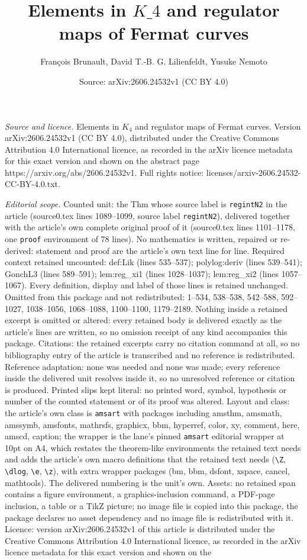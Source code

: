 \documentclass[10pt,a4paper]{amsart}
\title[Elements in $K\_4$ and regulator maps of Fermat curves]{Elements in $K\_4$ and regulator maps of Fermat curves}
\author{Fran\c{c}ois Brunault, David T.-B. G. Lilienfeldt, Yusuke Nemoto}
\date{Source: arXiv:2606.24532v1 (CC BY 4.0)}
\begin{document}
\maketitle

\noindent\emph{Source and licence.} Elements in $K_4$ and regulator maps of Fermat curves. Version arXiv:2606.24532v1 (CC BY 4.0), distributed under the Creative Commons Attribution 4.0 International licence, as recorded in the arXiv licence metadata for this exact version and shown on the abstract page https://arxiv.org/abs/2606.24532v1. Full rights notice: licenses/arxiv-2606.24532-CC-BY-4.0.txt.\par\smallskip

\noindent\textit{Editorial scope.} Counted unit: the Thm whose source label is \texttt{regintN2} in the article (source0.tex lines 1089--1099, source label \texttt{regintN2}), delivered together with the article's own complete original proof of it (source0.tex lines 1101--1178, one \texttt{proof} environment of 78 lines). No mathematics is written, repaired or re-derived: statement and proof are the article's own text line for line. Required context retained uncounted: def:Lik (lines 535--537); polylog:deriv (lines 539--541); GonchL3 (lines 589--591); lem:reg\_xi1 (lines 1028--1037); lem:reg\_xi2 (lines 1057--1067). Every definition, display and label of those lines is retained unchanged. Omitted from this package and not redistributed: 1--534, 538--538, 542--588, 592--1027, 1038--1056, 1068--1088, 1100--1100, 1179--2189. Nothing inside a retained excerpt is omitted or altered: every retained body is delivered exactly as the article's lines are written, so no omission receipt of any kind accompanies this package. Citations: the retained excerpts carry no citation command at all, so no bibliography entry of the article is transcribed and no reference is redistributed. Reference adaptation: none was needed and none was made; every reference inside the delivered unit resolves inside it, so no unresolved reference or citation is produced. Printed slips kept literal: no printed word, symbol, hypothesis or number of the counted statement or of its proof was altered. Layout and class: the article's own class is \texttt{amsart} with packages including amsthm, amsmath, amssymb, amsfonts, mathrsfs, graphicx, bbm, hyperref, color, xy, comment, here, amscd, caption; the wrapper is the lane's pinned \texttt{amsart} editorial wrapper at 10pt on A4, which restates the theorem-like environments the retained text needs and adds the article's own macro definitions that the retained text needs (\texttt{\textbackslash Z}, \texttt{\textbackslash dlog}, \texttt{\textbackslash e}, \texttt{\textbackslash z}), with extra wrapper packages (bm, bbm, dsfont, xspace, cancel, mathtools). The delivered numbering is the unit's own. Assets: no retained span contains a figure environment, a graphics-inclusion command, a PDF-page inclusion, a table or a TikZ picture; no image file is copied into this package, the package declares no asset dependency and no image file is redistributed with it. Licence: version arXiv:2606.24532v1 of this article is distributed under the Creative Commons Attribution 4.0 International licence, as recorded in the arXiv licence metadata for this exact version and shown on the 
\end{document}
